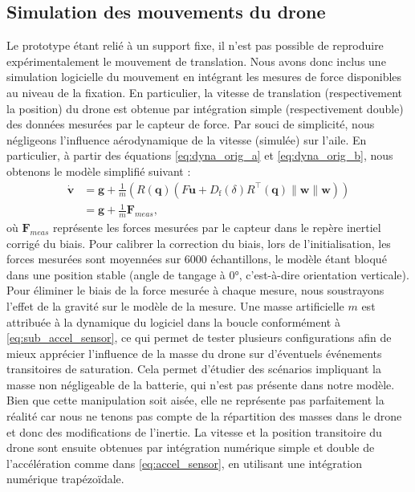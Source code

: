 \subsection{Simulation des mouvements du drone}
Le prototype étant relié à un support fixe, il n'est pas possible de reproduire expérimentalement le mouvement de translation.  Nous avons donc inclus une simulation logicielle du mouvement en intégrant les mesures de force disponibles au niveau de la fixation. En particulier, la vitesse de translation (respectivement la position) du drone est obtenue par intégration simple (respectivement double) des données mesurées par le capteur de force. Par souci de simplicité, nous négligeons l'influence aérodynamique de la vitesse (simulée) sur l'aile. En particulier, à partir des équations \eqref{eq:dyna_orig_a} et \eqref{eq:dyna_orig_b}, nous obtenons le modèle simplifié suivant : 
\begin{subequations}\label{eq:accel_sensor}
    \begin{align}
        \boldsymbol{\dot v} &= \boldsymbol{g} + \frac{1}{m}\left( R(\boldsymbol{q})(F\boldsymbol{u} +  D_{\text{f}}(\delta) R^\top(\boldsymbol{q})\lVert \boldsymbol{w} \rVert \boldsymbol{w}) \right)\\
        &= \boldsymbol{g} + \frac{1}{m} \boldsymbol{F}_{meas} \label{eq:sub_accel_sensor},
    \end{align}
\end{subequations}
où $\boldsymbol{F}_{meas}$ représente les forces mesurées par le capteur dans le repère inertiel corrigé du biais. Pour calibrer la correction du biais, lors de l'initialisation, les forces mesurées sont moyennées sur 6000 échantillons, le modèle étant bloqué dans une position stable (angle de tangage à 0°, c'est-à-dire orientation verticale). Pour éliminer le biais de la force mesurée à chaque mesure, nous soustrayons l'effet de la gravité sur le modèle de la mesure. Une masse artificielle $m$ est attribuée à la dynamique du logiciel dans la boucle conformément à \eqref{eq:sub_accel_sensor}, ce qui permet de tester plusieurs configurations afin de mieux apprécier l'influence de la masse du drone sur d'éventuels événements transitoires de saturation. Cela permet d'étudier des scénarios impliquant la masse non négligeable de la batterie, qui n'est pas présente dans notre modèle. Bien que cette manipulation soit aisée, elle ne représente pas parfaitement la réalité car nous ne tenons pas compte de la répartition des masses dans le drone et donc des modifications de l'inertie.
La vitesse et la position transitoire du drone sont ensuite obtenues par intégration numérique simple et double de l'accélération comme dans \eqref{eq:accel_sensor}, en utilisant une intégration numérique trapézoïdale.

